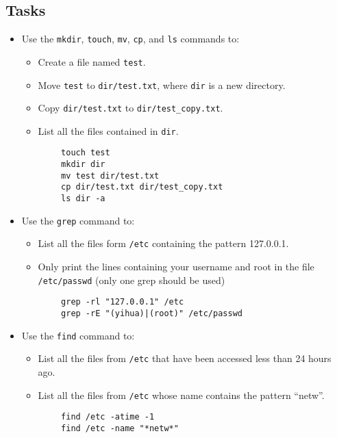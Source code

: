 \documentclass[a4paper]{article}
\begin{document}
\subsection{Tasks}
\begin{itemize}
    \item Use the \texttt{mkdir}, \texttt{touch}, \texttt{mv}, \texttt{cp}, and \texttt{ls} commands to:
    \begin{itemize}
        \item Create a file named \texttt{test}.
        \item Move \texttt{test} to \texttt{dir/test.txt}, where \texttt{dir} is a new directory.
        \item Copy \texttt{dir/test.txt} to \texttt{dir/test\_copy.txt}.
        \item List all the files contained in \texttt{dir}.
    \end{itemize}
    \begin{verbatim}
        touch test
        mkdir dir
        mv test dir/test.txt
        cp dir/test.txt dir/test_copy.txt
        ls dir -a
    \end{verbatim}
    \item Use the \texttt{grep} command to:
    \begin{itemize}
        \item List all the files form \texttt{/etc} containing the pattern 127.0.0.1.
        \item Only print the lines containing your username and root in the file \texttt{/etc/passwd} (only one grep should be used)
    \end{itemize}
    \begin{verbatim}
        grep -rl "127.0.0.1" /etc
        grep -rE "(yihua)|(root)" /etc/passwd
    \end{verbatim}
    \item Use the \texttt{find} command to:
    \begin{itemize}
        \item List all the files from \texttt{/etc} that have been accessed less than 24 hours ago.
        \item List all the files from \texttt{/etc} whose name contains the pattern “netw”.
    \end{itemize}
    \begin{verbatim}
        find /etc -atime -1
        find /etc -name "*netw*"

\end{verbatim}
\end{itemize}
\end{document}
